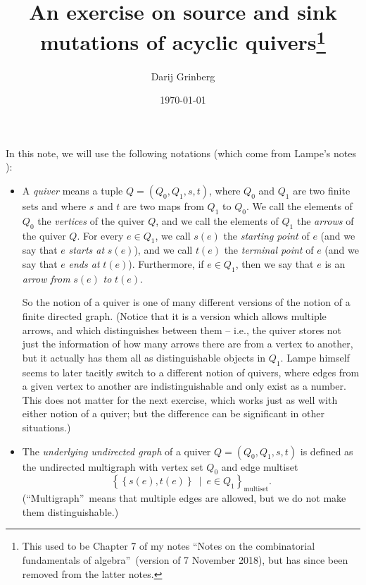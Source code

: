 \documentclass[numbers=enddot,12pt,final,onecolumn,notitlepage]{scrartcl}%
\newcounter{exer}
\numberwithin{exer}{section}
\theoremstyle{definition}
\begin{document}
\title{An exercise on source and sink mutations of acyclic quivers\thanks{This used
to be Chapter 7 of my notes \textquotedblleft Notes on the combinatorial
fundamentals of algebra\textquotedblright\ (version of 7 November 2018), but
has since been removed from the latter notes.}}
\author{Darij Grinberg}
\date{
\today
}
\maketitle

In this note, we will use the following notations (which come from Lampe's
notes \cite[\S 2.1.1]{Lampe}):

\begin{itemize}
\item A \textit{quiver} means a tuple $Q=\left(  Q_{0},Q_{1},s,t\right)  $,
where $Q_{0}$ and $Q_{1}$ are two finite sets and where $s$ and $t$ are two
maps from $Q_{1}$ to $Q_{0}$. We call the elements of $Q_{0}$ the
\textit{vertices} of the quiver $Q$, and we call the elements of $Q_{1}$ the
\textit{arrows} of the quiver $Q$. For every $e\in Q_{1}$, we call $s\left(
e\right)  $ the \textit{starting point} of $e$ (and we say that $e$
\textit{starts at }$s\left(  e\right)  $), and we call $t\left(  e\right)  $
the \textit{terminal point} of $e$ (and we say that $e$ \textit{ends at}
$t\left(  e\right)  $). Furthermore, if $e\in Q_{1}$, then we say that $e$ is
an \textit{arrow from }$s\left(  e\right)  $ \textit{to }$t\left(  e\right)  $.

So the notion of a quiver is one of many different versions of the notion of a
finite directed graph. (Notice that it is a version which allows multiple
arrows, and which distinguishes between them -- i.e., the quiver stores not
just the information of how many arrows there are from a vertex to another,
but it actually has them all as distinguishable objects in $Q_{1}$. Lampe
himself seems to later tacitly switch to a different notion of quivers, where
edges from a given vertex to another are indistinguishable and only exist as a
number. This does not matter for the next exercise, which works just as well
with either notion of a quiver; but the difference can be significant in other situations.)

\item The \textit{underlying undirected graph} of a quiver $Q=\left(
Q_{0},Q_{1},s,t\right)  $ is defined as the undirected multigraph with vertex
set $Q_{0}$ and edge multiset%
\[
\left\{  \left\{  s\left(  e\right)  ,t\left(  e\right)  \right\}
\ \mid\ e\in Q_{1}\right\}  _{\operatorname*{multiset}}.
\]
(\textquotedblleft Multigraph\textquotedblright\ means that multiple edges are
allowed, but we do not make them distinguishable.)


\end{itemize}
\end{document}
